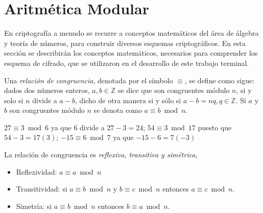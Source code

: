 


\section{Aritmética Modular}
En criptograf\'ia a menudo se recurre a conceptos matem\'aticos del \'area de \'algebra y teor\'ia de n\'umeros, para
construir diversos esquemas criptogr\'aficos. En esta secci\'on se describir\'an los conceptos matem\'aticos,
necesarios para comprender los esquema de cifrado, que se utilizaron en el desarrollo de este trabajo terminal. 

\begin{definition}
Una {\it relaci\'on de congruencia}, denotada por el s\'imbolo $\equiv$, se 
define como sigue: dados dos n\'umeros enteros, $a,b \in \mathbb{Z}$ se dice que son congruentes
m\'odulo $n$, si y solo si $n$ divide a $a-b$, dicho de otra manera si y s\'olo
si $a-b=nq, q \in \mathbb{Z}$. Si $a$ y $b$ son congruentes m\'odulo $n$ se denota como $a \equiv b \bmod n$.
\end{definition}
\begin{example}
$27 \equiv 3 \bmod 6$ ya que 6 divide a $27-3=24$; 
 $54 \equiv 3 \bmod 17$ puesto que $54-3=17(3)$; 
 $-15 \equiv 6 \bmod 7$ ya que $-15-6=7(-3)$
\end{example}
La relaci\'on de congruencia es {\it reflexiva, transitiva y sim\'etrica}, 
\begin{itemize}
\item Reflexividad:  $a \equiv a \bmod n$ 


\item Transitividad: si $a \equiv b \bmod n$ y $b \equiv c \bmod n$ entonces
$a \equiv c \bmod n$. 

\item Simetr\'ia: si $a \equiv b \bmod n$ entonces $b \equiv a \bmod n$.
\end{itemize}

